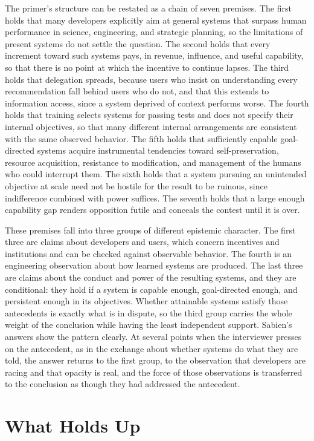 \documentclass[11pt]{article}
\begin{document}
The primer's structure can be restated as a chain of seven premises. The first holds that many developers explicitly aim at general systems that surpass human performance in science, engineering, and strategic planning, so the limitations of present systems do not settle the question. The second holds that every increment toward such systems pays, in revenue, influence, and useful capability, so that there is no point at which the incentive to continue lapses. The third holds that delegation spreads, because users who insist on understanding every recommendation fall behind users who do not, and that this extends to information access, since a system deprived of context performs worse. The fourth holds that training selects systems for passing tests and does not specify their internal objectives, so that many different internal arrangements are consistent with the same observed behavior. The fifth holds that sufficiently capable goal-directed systems acquire instrumental tendencies toward self-preservation, resource acquisition, resistance to modification, and management of the humans who could interrupt them. The sixth holds that a system pursuing an unintended objective at scale need not be hostile for the result to be ruinous, since indifference combined with power suffices. The seventh holds that a large enough capability gap renders opposition futile and conceals the contest until it is over.

These premises fall into three groups of different epistemic character. The first three are claims about developers and users, which concern incentives and institutions and can be checked against observable behavior. The fourth is an engineering observation about how learned systems are produced. The last three are claims about the conduct and power of the resulting systems, and they are conditional: they hold if a system is capable enough, goal-directed enough, and persistent enough in its objectives. Whether attainable systems satisfy those antecedents is exactly what is in dispute, so the third group carries the whole weight of the conclusion while having the least independent support. Sabien's answers show the pattern clearly. At several points when the interviewer presses on the antecedent, as in the exchange about whether systems do what they are told, the answer returns to the first group, to the observation that developers are racing and that opacity is real, and the force of those observations is transferred to the conclusion as though they had addressed the antecedent.

\section{What Holds Up}
\end{document}
